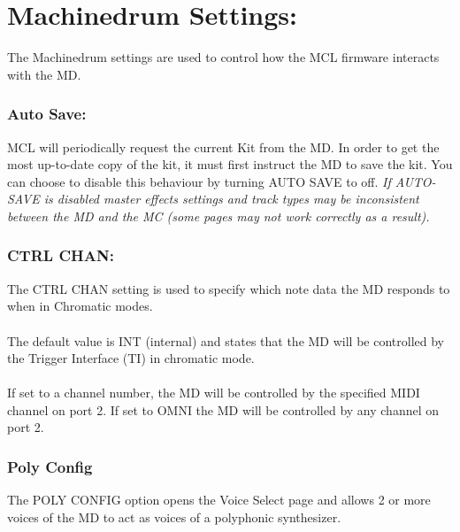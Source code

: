 \chapter{Machinedrum Settings:}
The Machinedrum settings are used to control how the MCL firmware interacts with the MD.
\\
\subsection{Auto Save:}
MCL will periodically request the current Kit from the MD. In order to get the most up-to-date copy of the kit, it must first instruct the MD to save the kit. You can choose to disable this behaviour by turning AUTO SAVE to off. \textit{If AUTO-SAVE is disabled master effects settings and track types may be inconsistent between the MD and the MC (some pages may not work correctly as a result).}

\subsection{CTRL CHAN:}
The CTRL CHAN setting is used to specify which note data the MD responds to when in Chromatic modes. \\\\The default value is INT (internal) and states that the MD will be controlled by the Trigger Interface (TI) in chromatic mode. \\
\\If set to a channel number, the MD will be controlled by the specified MIDI channel on port 2. If set to OMNI the MD will be controlled by any channel on port 2.
\subsection{Poly Config}
The POLY CONFIG option opens the Voice Select page and allows 2 or more voices of the MD to act as voices of a polyphonic synthesizer.
\pagebreak